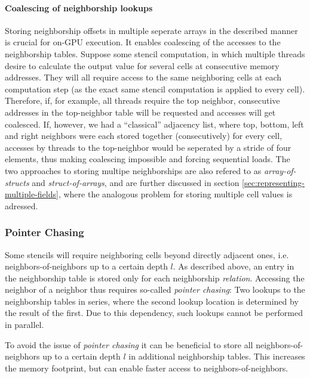 \paragraph{Coalescing of neighborship lookups}

Storing neighborship offsets in multiple seperate arrays in the described manner is crucial for on-GPU execution. It enables coalescing of the accesses to the neighborship tables. Suppose some stencil computation, in which multiple threads desire to calculate the output value for several cells at consecutive memory addresses. They will all require access to the same neighboring cells at each computation step (as the exact same stencil computation is applied to every cell). Therefore, if, for example, all threads require the top neighbor, consecutive addresses in the top-neighbor table will be requested and accesses will get coalesced. If, however, we had a ``classical'' adjacency list, where top, bottom, left and right neighbors were each stored together (consecutively) for every cell, accesses by threads to the top-neighbor would be seperated by a stride of four elements, thus making coalescing impossible and forcing sequential loads. The two approaches to storing multipe neighborships are also refered to as \emph{array-of-structs} and \emph{struct-of-arrays}, and are further discussed in section \ref{sec:representing-multiple-fields}, where the analogous problem for storing multiple cell values is adressed.

\subsubsection{Pointer Chasing}

Some stencils will require neighboring cells beyond directly adjacent ones, i.e. neighbors-of-neighbors up to a certain depth $l$. As described above, an entry in the neighborship table is stored only for each neighborship \emph{relation}. Accessing the neighbor of a neighbor thus requires so-called \emph{pointer chasing}: Two lookups to the neighborship tables in series, where the second lookup location is determined by the result of the first. Due to this dependency, such lookups cannot be performed in parallel.

To avoid the issue of \emph{pointer chasing} it can be beneficial to store all neighbors-of-neigbhors up to a certain depth $l$ in additional neighborship tables. This increases the memory footprint, but can enable faster access to neighbors-of-neighbors.

